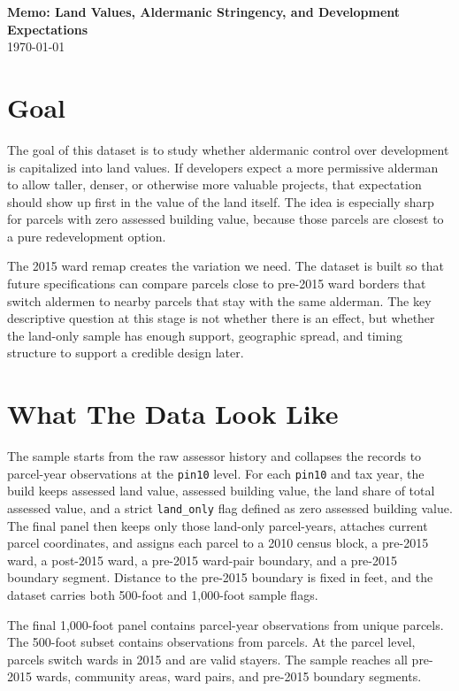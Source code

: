 \documentclass[11pt]{article}
\begin{document}
\begin{center}
{\Large \textbf{Memo: Land Values, Aldermanic Stringency, and Development Expectations}}\\[0.5em]
\today
\end{center}

\section*{Goal}

The goal of this dataset is to study whether aldermanic control over development is capitalized into land values. If developers expect a more permissive alderman to allow taller, denser, or otherwise more valuable projects, that expectation should show up first in the value of the land itself. The idea is especially sharp for parcels with zero assessed building value, because those parcels are closest to a pure redevelopment option.

The 2015 ward remap creates the variation we need. The dataset is built so that future specifications can compare parcels close to pre-2015 ward borders that switch aldermen to nearby parcels that stay with the same alderman. The key descriptive question at this stage is not whether there is an effect, but whether the land-only sample has enough support, geographic spread, and timing structure to support a credible design later.

\section*{What The Data Look Like}

The sample starts from the raw assessor history and collapses the records to parcel-year observations at the \texttt{pin10} level. For each \texttt{pin10} and tax year, the build keeps assessed land value, assessed building value, the land share of total assessed value, and a strict \texttt{land\_only} flag defined as zero assessed building value. The final panel then keeps only those land-only parcel-years, attaches current parcel coordinates, and assigns each parcel to a 2010 census block, a pre-2015 ward, a post-2015 ward, a pre-2015 ward-pair boundary, and a pre-2015 boundary segment. Distance to the pre-2015 boundary is fixed in feet, and the dataset carries both 500-foot and 1,000-foot sample flags.

The final 1,000-foot panel contains \PanelRows{} parcel-year observations from \PanelPins{} unique parcels. The 500-foot subset contains \SubsetRows{} observations from \SubsetPins{} parcels. At the parcel level, \SwitcherPins{} parcels switch wards in 2015 and \ValidControlPins{} are valid stayers. The sample reaches all \WardCount{} pre-2015 wards, \CommunityAreaCount{} community areas, \WardPairCount{} ward pairs, and \SegmentCount{} pre-2015 boundary segments.
\end{document}
